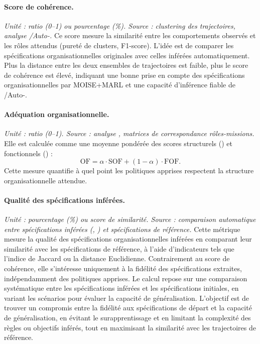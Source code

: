 \paragraph{Score de cohérence.}
\textit{Unité : ratio (0–1) ou pourcentage (\%). Source : clustering des trajectoires, analyse /Auto-.}
Ce score mesure la similarité entre les comportements observés et les rôles attendus (pureté de clusters, F1-score).
L’idée est de comparer les spécifications organisationnelles originales avec celles inférées automatiquement.
Plus la distance entre les deux ensembles de trajectoires est faible, plus le score de cohérence est élevé, indiquant une bonne prise en compte des spécifications organisationnelles par MOISE+MARL et une capacité d’inférence fiable de /Auto-.

\paragraph{Adéquation organisationnelle.}
\textit{Unité : ratio (0–1). Source : analyse , matrices de correspondance rôles-missions.}
Elle est calculée comme une moyenne pondérée des scores structurels () et fonctionnels () :
\[
  \text{OF} = \alpha \cdot \text{SOF} + (1-\alpha) \cdot \text{FOF}.
\]
Cette mesure quantifie à quel point les politiques apprises respectent la structure organisationnelle attendue.

\paragraph{Qualité des spécifications inférées.}
\textit{Unité : pourcentage (\%) ou score de similarité. Source : comparaison automatique entre spécifications inférées (, ) et spécifications de référence.}
Cette métrique mesure la qualité des spécifications organisationnelles inférées en comparant leur similarité avec les spécifications de référence, à l’aide d’indicateurs tels que l’indice de Jaccard ou la distance Euclidienne. Contrairement au score de cohérence, elle s’intéresse uniquement à la fidélité des spécifications extraites, indépendamment des politiques apprises. Le calcul repose sur une comparaison systématique entre les spécifications inférées et les spécifications initiales, en variant les scénarios pour évaluer la capacité de généralisation. L’objectif est de trouver un compromis entre la fidélité aux spécifications de départ et la capacité de généralisation, en évitant le surapprentissage et en limitant la complexité des règles ou objectifs inférés, tout en maximisant la similarité avec les trajectoires de référence.

